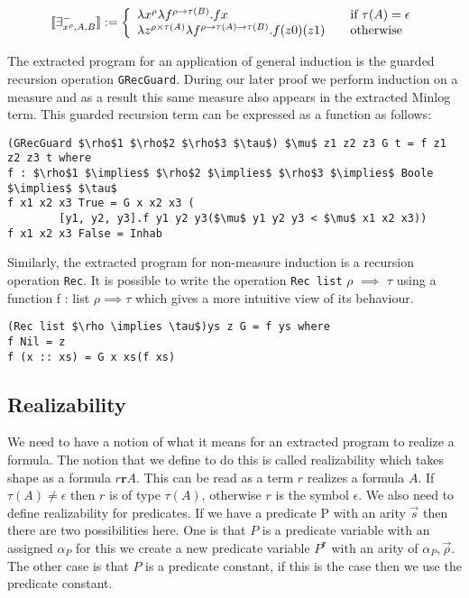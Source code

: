 \[ \llbracket \exists^{-}_{x^{\rho}, A, B} \rrbracket := \left\{ 
\begin{array}{l l}
\lambda x^{\rho} \lambda f^{\rho \to \tau (B)}. f x  & \quad \text{if $\tau (A) = \epsilon$} \\ 
\lambda z^{\rho \times \tau (A)} \lambda f^{\rho \to \tau (A) \to \tau (B)}. f
(z0) (z1) & \quad \text{otherwise} \\

\end{array} \right.
\]

The extracted program for an application of general induction is the guarded recursion operation \texttt{GRecGuard}. During our later proof we perform induction on a measure and as a result this same measure also appears in the extracted Minlog term.  This guarded recursion term can be expressed as a function as follows:

\begin{lstlisting}[caption = The Guarded Recursion Operation Used in the Minlog System, mathescape]
(GRecGuard $\rho$1 $\rho$2 $\rho$3 $\tau$) $\mu$ z1 z2 z3 G t = f z1 z2 z3 t where
f : $\rho$1 $\implies$ $\rho$2 $\implies$ $\rho$3 $\implies$ Boole $\implies$ $\tau$
f x1 x2 x3 True = G x x2 x3 (
        [y1, y2, y3].f y1 y2 y3($\mu$ y1 y2 y3 < $\mu$ x1 x2 x3))
f x1 x2 x3 False = Inhab
\end{lstlisting}


Similarly, the extracted program for non-measure induction is a recursion operation \texttt{Rec}. It is possible to write the operation \texttt{Rec list} $\rho$ $\implies$ $\tau$ using a function
f : list $\rho \implies \tau$ which gives a more intuitive view of its behaviour.
\begin{lstlisting}[caption = The Recursion Operation Used in the Minlog System ,mathescape]
(Rec list $\rho \implies \tau$)ys z G = f ys where
f Nil = z
f (x :: xs) = G x xs(f xs)
\end{lstlisting}

\subsection*{Realizability}
We need to have a notion of what it means for an extracted program to realize
a formula. The notion that we define to do this is called realizability which takes shape as a formula $r \textbf{r} A$. This can be read as
a term $r$ realizes a formula $A$. If $\tau(A) \neq \epsilon$ then $r$ is of type $\tau (A)$,
otherwise $r$ is the symbol $\epsilon$. We also need to define realizability
for predicates. If we have a predicate P
with an arity $\vec{s}$ then there are two possibilities here. One is that
$P$ is a predicate variable with an assigned $\alpha_P$ for this we create a new
predicate variable $P^{\textbf{r}}$ with an arity of $\alpha_P,\vec{\rho}$. 
The other case is that $P$ is a predicate constant, if this is the case then
we use the predicate constant.



